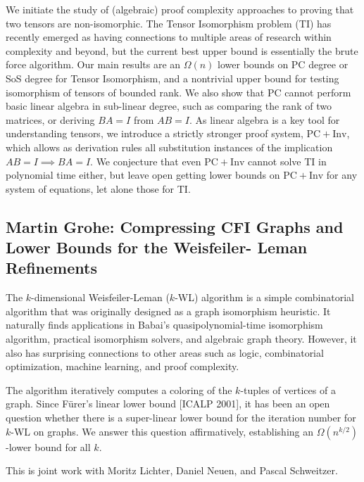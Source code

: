 \documentclass[11pt]{article}
\begin{document}
We initiate the study of (algebraic) proof complexity approaches to proving that two tensors are non-isomorphic. The Tensor Isomorphism problem (TI) has recently emerged as having connections to multiple areas of research within complexity and beyond, but the current best upper bound is essentially the brute force algorithm. 
Our main results are an $\Omega(n)$ lower bounds on PC degree or SoS degree for Tensor Isomorphism, and a nontrivial upper bound for testing isomorphism of tensors of bounded rank.
We also show that PC cannot perform basic linear algebra in sub-linear degree, such as comparing the rank of two matrices, or deriving $BA = I$ from $AB = I$. As linear algebra is a key tool for understanding tensors, we introduce a strictly stronger proof system, $\mathrm{PC}+\mathrm{Inv}$, which allows as derivation rules all substitution instances of the implication $AB = I \implies BA = I$. We conjecture that even $\mathrm{PC}+\mathrm{Inv}$ cannot solve TI in polynomial time either, but leave open getting lower bounds on $\mathrm{PC}+\mathrm{Inv}$ for any system of equations, let alone those for TI. 


\subsection*{Martin Grohe: Compressing CFI Graphs and Lower Bounds for the Weisfeiler-
Leman Refinements}\label{Grohe}

The $k$-dimensional Weisfeiler-Leman ($k$-WL) algorithm is a simple combinatorial algorithm that was originally designed as a graph isomorphism heuristic. It naturally finds applications in Babai's quasipolynomial-time isomorphism algorithm, practical isomorphism solvers, and algebraic graph theory. However, it also has surprising connections to other areas such as logic, combinatorial optimization, machine learning, and proof complexity.

The algorithm iteratively computes a coloring of the $k$-tuples of vertices of a graph. Since F\"{u}rer's linear lower bound [ICALP 2001], it has been an open question whether there is a super-linear lower bound for the iteration number for $k$-WL on graphs. We answer this question affirmatively, establishing an $\Omega(n^{k/2})$-lower bound for all $k$.

This is joint work with Moritz Lichter, Daniel Neuen, and Pascal Schweitzer.
\end{document}
